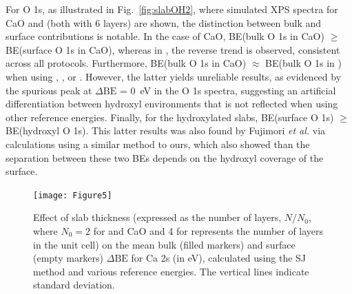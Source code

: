 \documentclass[journal=jpccck,manuscript=article]{achemso}
\def\dbe{\ensuremath{\Delta\text{BE}}}
\begin{document}
For O 1s, as illustrated in Fig.~\ref{fig:slabOH2}, where simulated XPS spectra for CaO and  (both with 6 layers) are shown, the distinction between bulk and surface contributions is notable. In the case of CaO, BE(bulk O 1s in CaO) $\geq$ BE(surface O 1s in CaO), whereas in , the reverse trend is observed, consistent across all protocols. Furthermore, BE(bulk O 1s in CaO) $\approx$ BE(bulk O 1s in ) when using , , or . However, the latter yields unreliable results, as evidenced by the spurious peak at \dbe{} = \SI{0}{\electronvolt} in the O 1s spectra, suggesting an artificial differentiation between hydroxyl environments that is not reflected when using other reference energies. Finally, for the hydroxylated slabs, BE(surface O 1s) $\geq$ BE(hydroxyl O 1s). This latter results was also found by Fujimori \emph{et al.} \cite{fujimoriInteractionWaterCaO2016a} via calculations using a similar method to ours, which also showed than the separation between these two BEs depends on the hydroxyl coverage of the surface.



\begin{figure}[!h]
	\centering
	\texttt{[image: Figure5]}
	\caption{Effect of slab thickness (expressed as the number of layers, $N/N_0$, where $N_0 = 2$ for  and CaO and 4 for  represents the number of layers in the unit cell) on the mean bulk (filled markers) and surface (empty markers) \dbe{} for Ca 2s (in \si{\electronvolt}), calculated using the SJ method and various reference energies. The vertical lines indicate standard deviation.}
	\label{fig:slabsthicknessSJ}
\end{figure}
\end{document}
